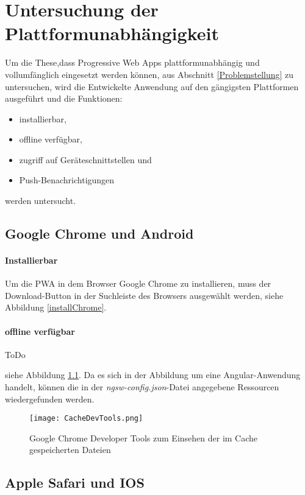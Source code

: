 \chapter{Untersuchung der Plattformunabhängigkeit}

Um die These,dass Progressive Web Apps plattformunabhängig und vollumfänglich eingesetzt werden können, aus Abschnitt \ref{Problemstellung} zu untersuchen, wird die Entwickelte Anwendung auf den gängigsten Plattformen ausgeführt und die Funktionen:
\begin{itemize}
    \item installierbar,
    \item offline verfügbar,
    \item zugriff auf Geräteschnittstellen und
    \item Push-Benachrichtigungen
\end{itemize} 
werden untersucht. 

\section{Google Chrome und Android}

\subsubsection*{Installierbar}

Um die PWA in dem Browser Google Chrome zu installieren, muss der Download-Button in der Suchleiste des Browsers ausgewählt werden, siehe Abbildung \ref{installChrome}.



\subsubsection{offline verfügbar}
ToDo 

siehe Abbildung \ref{img:CacheDevTools}. Da es sich in der Abbildung um eine Angular-Anwendung handelt, können die in der \textit{ngsw-config.json}-Datei angegebene Ressourcen wiedergefunden werden.   

\begin{figure}[!htb]
    \centering
    \texttt{[image: CacheDevTools.png]}
    \caption{Google Chrome Developer Tools zum Einsehen der im Cache gespeicherten Dateien}
    \label{img:CacheDevTools}
\end{figure}


\section{Apple Safari und IOS}

